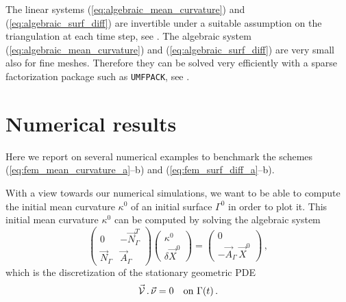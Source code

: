 The linear systems (\ref{eq:algebraic_mean_curvature}) and
(\ref{eq:algebraic_surf_diff}) are invertible under a suitable assumption on the
triangulation at each time step, see \cite{gflows3d}. The algebraic system
(\ref{eq:algebraic_mean_curvature}) and (\ref{eq:algebraic_surf_diff}) are
very small also for fine meshes. Therefore they can be solved very efficiently
with a sparse factorization package such as \verb|UMFPACK|, see \cite{Davis04}.

\section{Numerical results}\label{sec:geometric_pdes_results}
Here we report on several numerical examples to benchmark the schemes
(\ref{eq:fem_mean_curvature_a}--b) and (\ref{eq:fem_surf_diff_a}--b).

With a view towards our numerical simulations, we want to be able to compute
the initial mean curvature $\kappa^0$ of an initial surface $\Gamma^0$ in
order to plot it. This initial mean curvature $\kappa^0$ can be computed by
solving the algebraic system
\begin{equation}\label{eq:algebraic_initial_curvature}
\begin{pmatrix}
0 & -\vec N_\Gamma^{T} \\
\vec N_\Gamma & \vec A_\Gamma
\end{pmatrix}
\begin{pmatrix}
\kappa^0 \\
\delta \vec X^0
\end{pmatrix}
=
\begin{pmatrix}
0 \\
- \vec A_\Gamma \, \vec X^0
\end{pmatrix}
\,,
\end{equation}
which is the discretization of the stationary geometric PDE
\begin{equation}
\vec{\mathcal{V}}\,.\,\vec\nu=0\quad\mbox{on }\Gamma(t)\,.
\end{equation}

